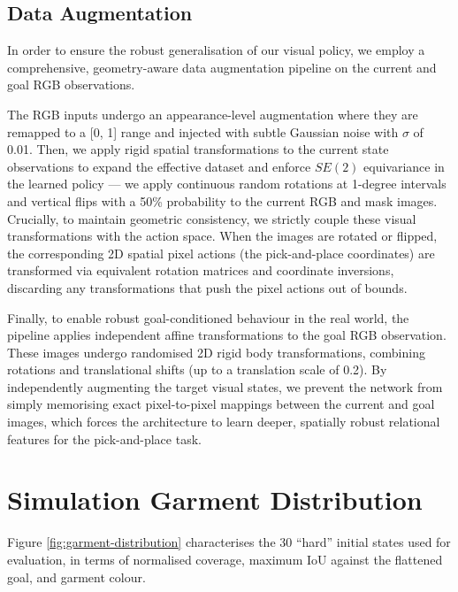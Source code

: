 \documentclass[journal]{IEEEtran}
\newif\ifshowrev\showrevtrue
\newcommand{\rev}[1]{\ifshowrev\textcolor{revblue}{#1}\else#1\fi}
\begin{document}
\subsection{Data Augmentation} \label{sec:data-aug}

In order to ensure the robust generalisation of our visual policy, we employ a comprehensive, geometry-aware data augmentation pipeline on the current and goal RGB observations.

The RGB inputs undergo an appearance-level augmentation where they are remapped to a [0, 1] range and injected with subtle Gaussian noise with $\sigma$ of 0.01. Then, we apply rigid spatial transformations to the current state observations to expand the effective dataset and enforce $SE(2)$ equivariance in the learned policy --- we apply continuous random rotations at 1-degree intervals and vertical flips with a 50\% probability to the current RGB and mask images. Crucially, to maintain geometric consistency, we strictly couple these visual transformations with the action space. When the images are rotated or flipped, the corresponding 2D spatial pixel actions (the pick-and-place coordinates) are transformed via equivalent rotation matrices and coordinate inversions,  discarding any transformations that push the pixel actions out of bounds.

Finally, to enable robust goal-conditioned behaviour in the real world, the pipeline applies independent affine transformations to the goal RGB observation. These images undergo randomised 2D rigid body transformations, combining rotations and translational shifts (up to a translation scale of 0.2). By independently augmenting the target visual states, we prevent the network from simply memorising exact pixel-to-pixel mappings between the current and goal images, which forces the architecture to learn deeper, spatially robust relational features for the pick-and-place task.


\section{Simulation Garment Distribution} \label{sec:garment-dist}

\rev{Figure \ref{fig:garment-distribution} characterises the 30 ``hard'' initial states used for evaluation, in terms of normalised coverage, maximum IoU against the flattened goal, and garment colour.}
\end{document}
